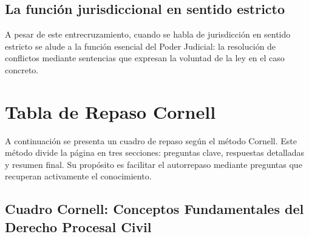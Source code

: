 \documentclass[12pt,oneside]{book}
\begin{document}
\section{La función jurisdiccional en sentido estricto}

A pesar de este entrecruzamiento, cuando se habla de jurisdicción en sentido estricto se alude a la función esencial del Poder Judicial: la resolución de conflictos mediante sentencias que expresan la voluntad de la ley en el caso concreto.


\chapter{Tabla de Repaso Cornell}

A continuación se presenta un cuadro de repaso según el método Cornell. Este método divide la página en tres secciones: preguntas clave, respuestas detalladas y resumen final. Su propósito es facilitar el autorrepaso mediante preguntas que recuperan activamente el conocimiento.

\section{Cuadro Cornell: Conceptos Fundamentales del Derecho Procesal Civil}
\end{document}

